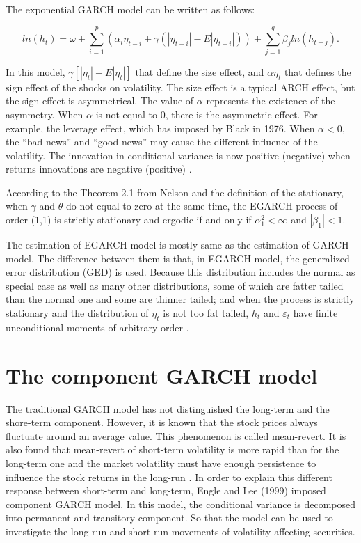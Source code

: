 The exponential GARCH model can be written as follows:

\begin{equation}
ln(h_t) =\omega + \sum_{i=1}^p(\alpha_i\eta_{t-i}+\gamma(|\eta_{t-i}|-E|\eta_{t-i}|))+\sum_{j=1}^q\beta_jln(h_{t-j}).
\end{equation}

In this model, $\gamma[|\eta_t|-E|\eta_t|]$ that define the size effect, and  $\alpha\eta_t$   that defines the sign effect of the shocks on volatility. The size effect is a typical ARCH effect, but the sign effect is asymmetrical. The value of $\alpha$ represents the existence of the asymmetry.  When $\alpha$ is not equal to 0, there is the asymmetric effect.  For example, the leverage effect, which has imposed by Black in 1976. When $\alpha<0$, the ``bad news'' and ``good news'' may cause the different influence of the volatility. The innovation in conditional variance is now positive (negative) when returns innovations are negative (positive) \citep{Nelson1991}.

According to the Theorem 2.1 from Nelson and the definition of the stationary, when $\gamma$  and $\theta$  do not equal to zero at the same time, the EGARCH process of order (1,1) is strictly stationary and ergodic if and only if $\alpha_1^2 < \infty$ and $|\beta_1|<1$. 

The estimation of EGARCH model is mostly same as the estimation of GARCH model. The difference between them is that, in EGARCH model, the generalized error distribution (GED) is used. Because this distribution includes the normal as special case as well as many other distributions, some of which are fatter tailed than the normal one and some are thinner tailed; and when the process is strictly stationary and the distribution of  $\eta_t$ is not too fat tailed, $h_t$ and $\varepsilon_t$ have finite unconditional moments of arbitrary order \citep{Nelson1991}.

\section{The component GARCH model}

The traditional GARCH model has not distinguished the long-term and the shore-term component. However, it is known that the stock prices always fluctuate around an average value. This phenomenon is called mean-revert. It is also found that mean-revert of short-term volatility is more rapid than for the long-term one and the market volatility must have enough persistence to influence the stock returns in the long-run \citep{XinzhongXuandStephenJ.Taylor1994}. In order to explain this different response between short-term and long-term, Engle and Lee (1999) imposed component GARCH model. In this model, the conditional variance is decomposed into permanent and transitory component. So that the model can be used to investigate the long-run and short-run movements of volatility affecting securities.

